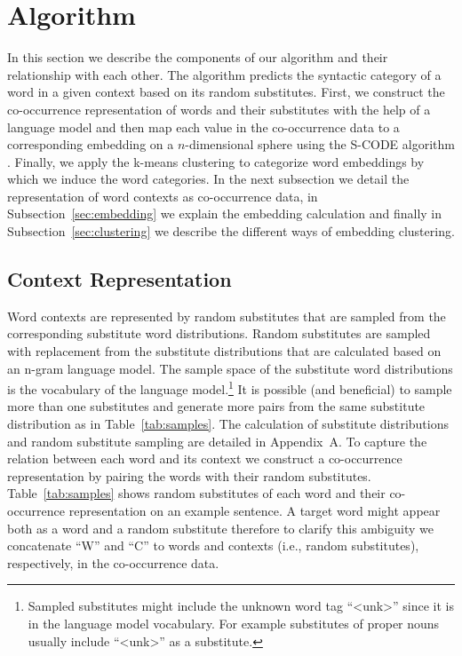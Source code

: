 \section{Algorithm}

In this section we describe the components of our algorithm and their
relationship with each other.  The algorithm predicts the syntactic
category of a word in a given context based on its random substitutes.
First, we construct the co-occurrence representation of words and
their substitutes with the help of a language model and then map each
value in the co-occurrence data to a corresponding embedding on a
$n$-dimensional sphere using the S-CODE algorithm
\cite{maron2010sphere}.  Finally, we apply the k-means clustering to
categorize word embeddings by which we induce the word categories.  In
the next subsection we detail the representation of word contexts as
co-occurrence data, in Subsection~\ref{sec:embedding} we explain the
embedding calculation and finally in Subsection~\ref{sec:clustering}
we describe the different ways of embedding clustering.

\subsection{Context Representation}
\label{sec:cooc}

Word contexts are represented by random substitutes that are sampled
from the corresponding substitute word distributions.  Random
substitutes are sampled with replacement from the substitute
distributions that are calculated based on an n-gram language model.
The sample space of the substitute word distributions is the
vocabulary of the language model.\footnote{Sampled substitutes might
  include the unknown word tag ``<unk>'' since it is in the language
  model vocabulary.  For example substitutes of proper nouns usually
  include ``<unk>'' as a substitute.}  It is possible (and beneficial)
to sample more than one substitutes and generate more pairs from the
same substitute distribution as in Table~\ref{tab:samples}.  The
calculation of substitute distributions and random substitute sampling
are detailed in Appendix~A.  To capture the relation between each word
and its context we construct a co-occurrence representation by pairing
the words with their random substitutes.  Table~\ref{tab:samples}
shows random substitutes of each word and their co-occurrence
representation on an example sentence.  A target word might appear
both as a word and a random substitute therefore to clarify this
ambiguity we concatenate ``W'' and ``C'' to words and contexts (i.e.,
random substitutes), respectively, in the co-occurrence data.

